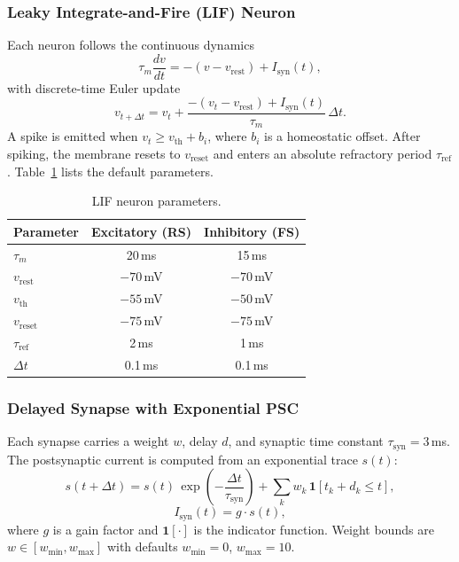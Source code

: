 \subsubsection{Leaky Integrate-and-Fire (LIF) Neuron}

Each neuron follows the continuous dynamics
\begin{equation}
\tau_m \frac{dv}{dt} = -(v - v_{\mathrm{rest}}) + I_{\mathrm{syn}}(t),
\label{eq:lif}
\end{equation}
with discrete-time Euler update
\begin{equation}
v_{t+\Delta t} = v_t + \frac{-(v_t - v_{\mathrm{rest}}) + I_{\mathrm{syn}}(t)}{\tau_m}\,\Delta t.
\end{equation}
A spike is emitted when $v_t \geq v_{\mathrm{th}} + b_i$, where $b_i$ is a homeostatic offset. After spiking, the membrane resets to $v_{\mathrm{reset}}$ and enters an absolute refractory period $\tau_{\mathrm{ref}}$. Table~\ref{tab:lif} lists the default parameters.

\begin{table}[h]
\centering
\caption{LIF neuron parameters.}
\label{tab:lif}
\begin{tabular}{@{}lcc@{}}
\toprule
\textbf{Parameter} & \textbf{Excitatory (RS)} & \textbf{Inhibitory (FS)} \\
\midrule
$\tau_m$ & 20\,ms & 15\,ms \\
$v_{\mathrm{rest}}$ & $-70$\,mV & $-70$\,mV \\
$v_{\mathrm{th}}$ & $-55$\,mV & $-50$\,mV \\
$v_{\mathrm{reset}}$ & $-75$\,mV & $-75$\,mV \\
$\tau_{\mathrm{ref}}$ & 2\,ms & 1\,ms \\
$\Delta t$ & 0.1\,ms & 0.1\,ms \\
\bottomrule
\end{tabular}
\end{table}

\subsubsection{Delayed Synapse with Exponential PSC}

Each synapse carries a weight $w$, delay $d$, and synaptic time constant $\tau_{\mathrm{syn}} = 3$\,ms. The postsynaptic current is computed from an exponential trace $s(t)$:
\begin{equation}
s(t+\Delta t) = s(t)\,\exp\!\left(-\frac{\Delta t}{\tau_{\mathrm{syn}}}\right) + \sum_k w_k\,\mathbf{1}[t_k + d_k \leq t],
\end{equation}
\begin{equation}
I_{\mathrm{syn}}(t) = g \cdot s(t),
\end{equation}
where $g$ is a gain factor and $\mathbf{1}[\cdot]$ is the indicator function. Weight bounds are $w \in [w_{\min}, w_{\max}]$ with defaults $w_{\min}=0$, $w_{\max}=10$.


